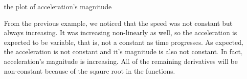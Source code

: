 \documentclass[12pt]{article}
\begin{document}
\noindent the plot of acceleration's magnitude\\

\noindent From the previous example, we noticed that the speed was not constant but always 
increasing. It was increasing non-linearly as well, so the acceleration is expected to be variable, that is, 
not a constant as time progresses. As expected, the acceleration is not constant and it's magnitude is also 
not constant. In fact, acceleration's magnitude is increasing. All of the remaining derivatives will be non-constant 
because of the sqaure root in the functions.\\\\
\end{document}
